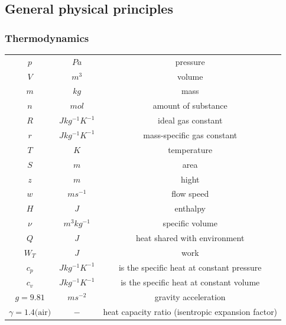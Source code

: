 \documentclass[class=article, crop=false]{standalone}
\begin{document}
\subsection{General physical principles}

\subsubsection{Thermodynamics}
\begin{tabular}{ |c|c|c| }
    \hline
    $p$                     & $Pa$              & pressure \\
    $V$                     & $m^3$             & volume \\
    $m$                     & $kg$              & mass \\
    $n$                     & $mol$             & amount of substance \\
    $R$                     & $Jkg^{-1}K^{-1}$  & ideal gas constant \\
    $r$                     & $Jkg^{-1}K^{-1}$  & mass-specific gas constant \\
    $T$                     & $K$               & temperature \\
    $S$                     & $m$               & area \\
    $z$                     & $m$               & hight \\
    $w$                     & $ms^{-1}$         & flow speed \\
    $H$                     & $J$               & enthalpy \\
    $\nu$                   & $m^3kg^{-1}$      & specific volume \\
    $Q$                     & $J$               & heat shared with
                                                    environment \\
    $W_T$                   & $J$               & work \\
    $c_p$                   & $Jkg^{-1}K^{-1}$  & is the specific heat
                                                    at constant pressure \\
    $c_v$                   & $Jkg^{-1}K^{-1}$  & is the specific heat at constant volume\\
    $g=9.81$                & $ms^{-2}$         & gravity acceleration \\
    $\gamma=1.4\text{(air)}$& $-$               & heat capacity ratio
                                                    (isentropic expansion factor)\\
    \hline
\end{tabular}
\end{document}
